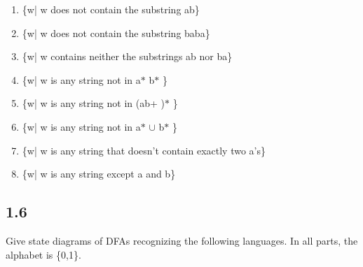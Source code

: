 \begin{enumerate}[label=(\alph*), leftmargin=2.5em]

\item \{w| w does not contain the substring ab\}

\item \{w| w does not contain the substring baba\}

\item \{w| w contains neither the substrings ab nor ba\}

\item \{w| w is any string not in a$\ast$ b$\ast$ \}

\item \{w| w is any string not in (ab+ )$\ast$ \}

\item \{w| w is any string not in a$\ast$ $\cup$ b$\ast$ \}

\item \{w| w is any string that doesn't contain exactly two a's\}

\item \{w| w is any string except a and b\}

\end{enumerate}


\subsection*{1.6}

Give state diagrams of DFAs recognizing the following languages. In all parts, the alphabet is \{0,1\}.

